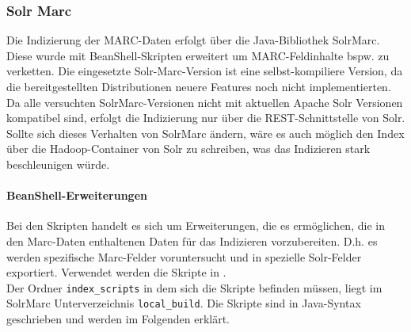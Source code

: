 \documentclass[10pt]{article}
\begin{document}
\subsubsection{Solr Marc}
Die Indizierung der MARC-Daten erfolgt über die Java-Bibliothek SolrMarc. Diese wurde mit BeanShell-Skripten erweitert um MARC-Feldinhalte bspw. zu verketten. Die eingesetzte Solr-Marc-Version ist eine selbst-kompiliere Version, da die bereitgestellten Distributionen neuere Features noch nicht implementierten. \\
Da alle versuchten SolrMarc-Versionen nicht mit aktuellen Apache Solr Versionen kompatibel sind, erfolgt die Indizierung nur über die REST-Schnittstelle von Solr. Sollte sich dieses Verhalten von SolrMarc ändern, wäre es auch möglich den Index über die Hadoop-Container von Solr zu schreiben, was das Indizieren stark beschleunigen würde.

\paragraph{BeanShell-Erweiterungen}
\label{para:beanShell}
Bei den Skripten handelt es sich um Erweiterungen, die es ermöglichen, die in den Marc-Daten enthaltenen Daten für das Indizieren vorzubereiten. D.h. es werden spezifische Marc-Felder voruntersucht und in spezielle Solr-Felder exportiert. Verwendet werden die Skripte in . \\ %
Der Ordner \texttt{index\_scripts} in dem sich die Skripte befinden müssen, liegt im SolrMarc Unterverzeichnis \texttt{local\_build}. Die Skripte sind in Java-Syntax geschrieben und werden im Folgenden erklärt.
\end{document}
